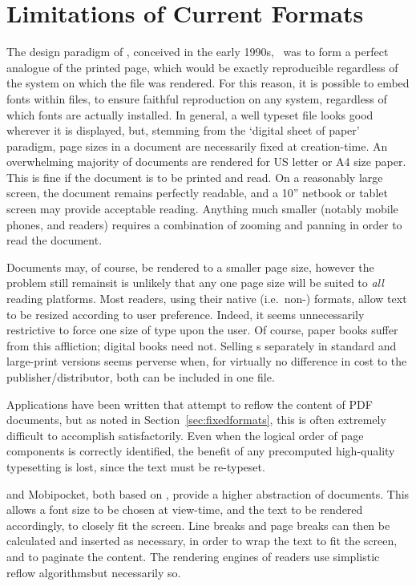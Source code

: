 \section{Limitations of Current Formats}

The design paradigm of \pdf{}, conceived in the early 1990s,~\cite{Warnock1991} was to form a perfect analogue of the printed page, which would be exactly reproducible regardless of the system on which the file was rendered. For this reason, it is possible to embed fonts within \pdf{} files, to ensure faithful reproduction on any system, regardless of which fonts are actually installed. In general, a well typeset \pdf{} file looks good wherever it is displayed, but, stemming from the `digital sheet of paper' paradigm, page sizes in a \pdf{} document are necessarily fixed at creation-time. An overwhelming majority of \pdf{} documents are rendered for  US letter or A4 size paper. This is fine if the document is to be printed and read. On a reasonably large screen, the document remains perfectly readable, and a 10'' netbook or tablet screen may provide acceptable reading. Anything much smaller (notably mobile phones, and \ebook{} readers) requires a combination of zooming and panning  in order to read the document.

Documents may, of course, be rendered to a smaller page size, however the problem still remains\ed it is unlikely that any one page size will be suited to \emph{all} reading platforms. Most \ebook{} readers, using their native (i.e.\ non-\pdf{}) formats, allow text to be resized according to user preference. Indeed, it seems unnecessarily restrictive to force one size of type upon the user. Of course, paper books suffer from this affliction; digital books need not. Selling \ebook{}s separately in standard and large-print versions seems perverse when, for virtually no difference in cost to the publisher/distributor, both can be included in one file.

Applications have been written that attempt to reflow the content of PDF documents, but as noted in Section~\ref{sec:fixedformats}, this is often extremely difficult to accomplish satisfactorily. Even when the logical order of page components is correctly identified, the benefit of any precomputed high-quality typesetting is lost, since the text must be re-typeset.



\epub{} and Mobipocket, both based on \html{}, provide a higher abstraction of documents. This allows a font size to be chosen at view-time, and the text to be rendered accordingly, to closely fit the screen. Line breaks and page breaks can then be calculated and inserted as necessary, in order to wrap the text to fit the screen, and to paginate the content. The rendering engines of \ebook{} readers use simplistic reflow algorithms\ed but necessarily so.

